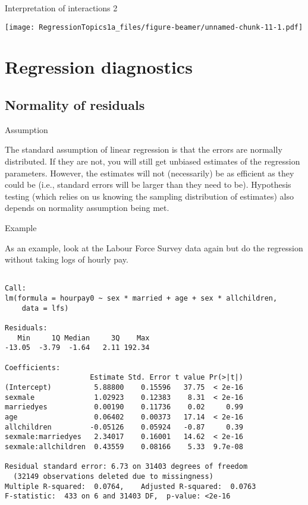 \documentclass[10pt,ignorenonframetext,]{beamer}
\begin{document}
\begin{frame}{Interpretation of interactions 2}

\texttt{[image: RegressionTopics1a\_files/figure-beamer/unnamed-chunk-11-1.pdf]}

\end{frame}

\section{Regression diagnostics}\label{regression-diagnostics}

\subsection{Normality of residuals}\label{normality-of-residuals}

\begin{frame}{Assumption}

The standard assumption of linear regression is that the errors are
normally distributed. If they are not, you will still get unbiased
estimates of the regression parameters. However, the estimates will not
(necessarily) be as efficient as they could be (i.e., standard errors
will be larger than they need to be). Hypothesis testing (which relies
on us knowing the sampling distribution of estimates) also depends on
normality assumption being met.

\end{frame}

\begin{frame}[fragile]{Example}

As an example, look at the Labour Force Survey data again but do the
regression without taking logs of hourly pay.

\scriptsize

\begin{verbatim}

Call:
lm(formula = hourpay0 ~ sex * married + age + sex * allchildren, 
    data = lfs)

Residuals:
   Min     1Q Median     3Q    Max 
-13.05  -3.79  -1.64   2.11 192.34 

Coefficients:
                    Estimate Std. Error t value Pr(>|t|)
(Intercept)          5.88800    0.15596   37.75  < 2e-16
sexmale              1.02923    0.12383    8.31  < 2e-16
marriedyes           0.00190    0.11736    0.02     0.99
age                  0.06402    0.00373   17.14  < 2e-16
allchildren         -0.05126    0.05924   -0.87     0.39
sexmale:marriedyes   2.34017    0.16001   14.62  < 2e-16
sexmale:allchildren  0.43559    0.08166    5.33  9.7e-08

Residual standard error: 6.73 on 31403 degrees of freedom
  (32149 observations deleted due to missingness)
Multiple R-squared:  0.0764,    Adjusted R-squared:  0.0763 
F-statistic:  433 on 6 and 31403 DF,  p-value: <2e-16
\end{verbatim}

\end{frame}
\end{document}
